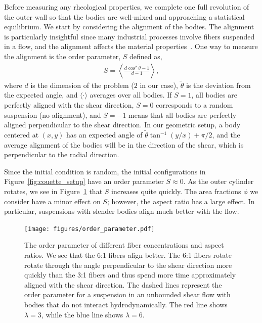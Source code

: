 \documentclass[AMA,STIX1COL]{WileyNJD-v2}
\begin{document}
Before measuring any rheological properties, we complete one full
revolution of the outer wall so that the bodies are well-mixed and
approaching a statistical equilibrium.  We start by considering the
alignment of the bodies. The alignment is particularly insightful since
many industrial processes involve fibers suspended in a flow, and the
alignment affects the material properties~\cite{larsoncf}.  One way to
measure the alignment is the order parameter, $S$ defined as,
\begin{align*}
  S = \left\langle \frac{d \cos^2\tilde{\theta} - 1}{d - 1} \right\rangle,
\end{align*}
where $d$ is the dimension of the problem ($2$ in our case),
$\tilde{\theta}$ is the deviation from the expected angle, and $\langle
\cdot\rangle$ averages over all bodies.  If $S=1$, all bodies are
perfectly aligned with the shear direction, $S=0$ corresponds to a
random suspension (no alignment), and $S=-1$ means that all bodies are
perfectly aligned perpendicular to the shear direction.  In our
geometric setup, a body centered at $(x,y)$ has an expected angle of
$\tilde{\theta}\tan^{-1}(y/x) + \pi/2$, and the average alignment of the
bodies will be in the direction of the shear, which is perpendicular to
the radial direction.

Since the initial condition is random, the initial configurations in
Figure~\ref{fig:couette_setup} have an order parameter $S\approx 0$. As
the outer cylinder rotates, we see in Figure~\ref{fig:angles} that $S$
increases quite quickly. The area fractions $\phi$ we consider have a
minor effect on $S$; however, the aspect ratio has a large effect.  In
particular, suspensions with slender bodies align much better with the
flow.

\begin{figure}[t]
  \centerline{
\texttt{[image: figures/order\_parameter.pdf]}
}
\caption{\label{fig:angles} The order parameter of different fiber
concentrations and aspect ratios. We see that the 6:1 fibers align
better. The 6:1 fibers rotate rotate through the angle perpendicular to
the shear direction more quickly than the 3:1 fibers and thus spend more
time approximately aligned with the shear direction. The dashed lines
represent the order parameter for a suspension in an unbounded shear
flow with bodies that do not interact hydrodynamically. The red line
shows $\lambda=3$, while the blue line shows $\lambda=6$. }
\end{figure} 
\end{document}
